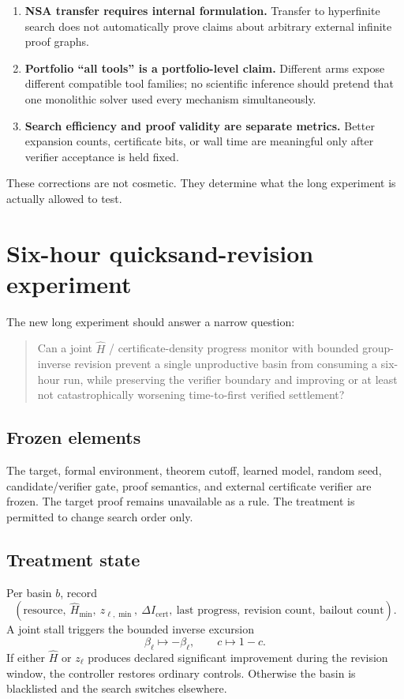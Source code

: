 \documentclass[11pt]{article}
\newcommand{\Hhat}{\widehat H}
\begin{document}
\begin{enumerate}[label=\textbf{C\arabic*.},leftmargin=2.6em]
\item \textbf{NSA transfer requires internal formulation.} Transfer to hyperfinite search does not automatically prove claims about arbitrary external infinite proof graphs.
\item \textbf{Portfolio ``all tools'' is a portfolio-level claim.} Different arms expose different compatible tool families; no scientific inference should pretend that one monolithic solver used every mechanism simultaneously.
\item \textbf{Search efficiency and proof validity are separate metrics.} Better expansion counts, certificate bits, or wall time are meaningful only after verifier acceptance is held fixed.
\end{enumerate}

These corrections are not cosmetic. They determine what the long experiment is actually allowed to test.

\section{Six-hour quicksand-revision experiment}

The new long experiment should answer a narrow question:
\begin{quote}
Can a joint $\Hhat$ / certificate-density progress monitor with bounded group-inverse revision prevent a single unproductive basin from consuming a six-hour run, while preserving the verifier boundary and improving or at least not catastrophically worsening time-to-first verified settlement?
\end{quote}

\subsection{Frozen elements}

The target, formal environment, theorem cutoff, learned model, random seed, candidate/verifier gate, proof semantics, and external certificate verifier are frozen. The target proof remains unavailable as a rule. The treatment is permitted to change search order only.

\subsection{Treatment state}

Per basin $b$, record
\[
(\text{resource},\ \Hhat_{\min},\ z_{\ell,\min},\ \Delta I_{\mathrm{cert}},\ \text{last progress},\ \text{revision count},\ \text{bailout count}).
\]
A joint stall triggers the bounded inverse excursion
\[
\beta_\ell\mapsto-\beta_\ell,
\qquad
c\mapsto1-c.
\]
If either $\Hhat$ or $z_\ell$ produces declared significant improvement during the revision window, the controller restores ordinary controls. Otherwise the basin is blacklisted and the search switches elsewhere.
\end{document}
